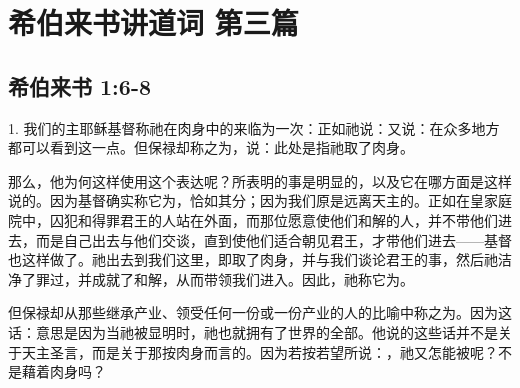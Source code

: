 

\section{希伯来书讲道词 第三篇}


\subsection{希伯来书 1:6-8}

\par

1. 我们的主耶稣基督称祂在肉身中的来临为一次：正如祂说：又说：在众多地方都可以看到这一点。但保禄却称之为，说：此处是指祂取了肉身。\par

那么，他为何这样使用这个表达呢？所表明的事是明显的，以及它在哪方面是这样说的。因为基督确实称它为，恰如其分；因为我们原是远离天主的。正如在皇家庭院中，囚犯和得罪君王的人站在外面，而那位愿意使他们和解的人，并不带他们进去，而是自己出去与他们交谈，直到使他们适合朝见君王，才带他们进去——基督也这样做了。祂出去到我们这里，即取了肉身，并与我们谈论君王的事，然后祂洁净了罪过，并成就了和解，从而带领我们进入。因此，祂称它为。\par

但保禄却从那些继承产业、领受任何一份或一份产业的人的比喻中称之为。因为这话：意思是因为当祂被显明时，祂也就拥有了世界的全部。他说的这些话并不是关于天主圣言，而是关于那按肉身而言的。因为若按若望所说：，祂又怎能被呢？不是藉着肉身吗？\par

